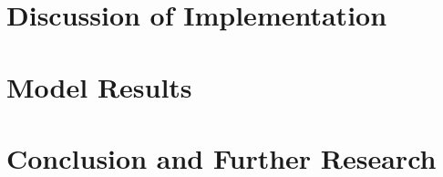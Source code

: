 \documentclass[10pt,a4paper, hidelinks]{article} %
\begin{document}
\section{Discussion of Implementation}
\lipsum

\section{Model Results}
\lipsum

\section{Conclusion and Further Research}
\lipsum
\end{document}
